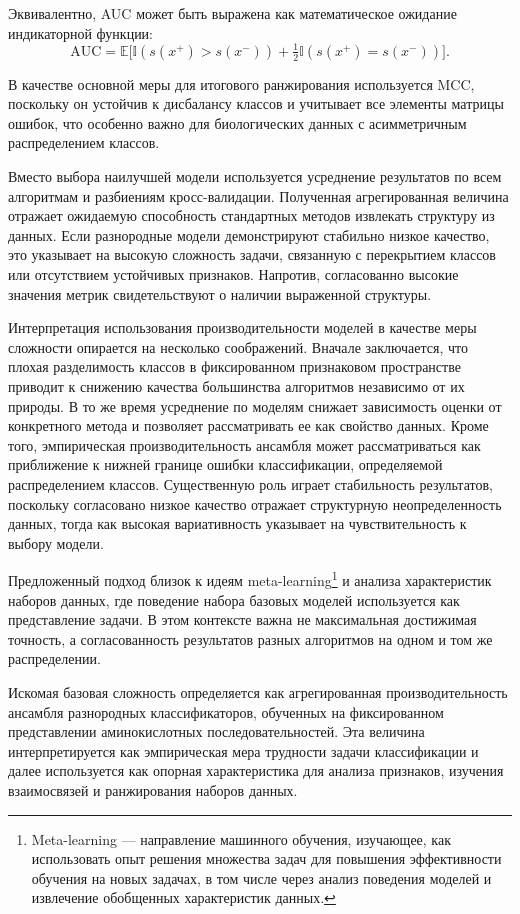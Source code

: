 \documentclass[specification,annotation,times]{itmo-student-thesis}
\begin{document}
Эквивалентно, AUC может быть выражена как математическое ожидание индикаторной функции:
\[
\mathrm{AUC} = \mathbb{E}\big[ \mathbb{I}(s(x^+) > s(x^-)) 
+ \tfrac{1}{2} \mathbb{I}(s(x^+) = s(x^-)) \big].
\]

В качестве основной меры для итогового ранжирования используется MCC, поскольку он устойчив к дисбалансу классов и учитывает все элементы матрицы ошибок, что особенно важно для биологических данных с асимметричным распределением классов.

Вместо выбора наилучшей модели используется усреднение результатов по всем алгоритмам и разбиениям кросс-валидации. Полученная агрегированная величина отражает ожидаемую способность стандартных методов извлекать структуру из данных. Если разнородные модели демонстрируют стабильно низкое качество, это указывает на высокую сложность задачи, связанную с перекрытием классов или отсутствием устойчивых признаков. Напротив, согласованно высокие значения метрик свидетельствуют о наличии выраженной структуры.

Интерпретация использования производительности моделей в качестве меры сложности опирается на несколько соображений. Вначале заключается, что плохая разделимость классов в фиксированном признаковом пространстве приводит к снижению качества большинства алгоритмов независимо от их природы. В то же время усреднение по моделям снижает зависимость оценки от конкретного метода и позволяет рассматривать ее как свойство данных. Кроме того, эмпирическая производительность ансамбля может рассматриваться как приближение к нижней границе ошибки классификации, определяемой распределением классов. Существенную роль играет стабильность результатов, поскольку согласовано низкое качество отражает структурную неопределенность данных, тогда как высокая вариативность указывает на чувствительность к выбору модели.

Предложенный подход близок к идеям meta-learning\footnote{Meta-learning — направление машинного обучения, изучающее, как использовать опыт решения множества задач для повышения эффективности обучения на новых задачах, в том числе через анализ поведения моделей и извлечение обобщенных характеристик данных.} и анализа характеристик наборов данных, где поведение набора базовых моделей используется как представление задачи. В этом контексте важна не максимальная достижимая точность, а согласованность результатов разных алгоритмов на одном и том же распределении.

Искомая базовая сложность определяется как агрегированная производительность ансамбля разнородных классификаторов, обученных на фиксированном представлении аминокислотных последовательностей. Эта величина интерпретируется как эмпирическая мера трудности задачи классификации и далее используется как опорная характеристика для анализа признаков, изучения взаимосвязей и ранжирования наборов данных.
\end{document}
